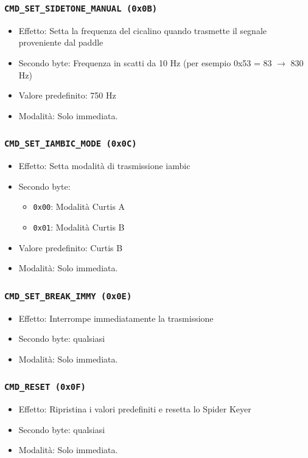 \subsubsection{\texttt{CMD\_SET\_SIDETONE\_MANUAL (0x0B)}}
\begin{itemize}
	\item Effetto: Setta la frequenza del cicalino quando trasmette il segnale proveniente dal paddle
	\item Secondo byte: Frequenza in scatti da 10 Hz (per esempio 0x53 = 83 $\rightarrow$ 830 Hz)
	\item Valore predefinito: 750 Hz
	\item Modalit\`a: Solo immediata.
\end{itemize}

\subsubsection{\texttt{CMD\_SET\_IAMBIC\_MODE (0x0C)}}
\begin{itemize}
	\item Effetto: Setta modalit\`a di trasmissione iambic
	\item Secondo byte:
	\begin{itemize}
		\item \texttt{0x00}: Modalit\`a Curtis A
		\item \texttt{0x01}: Modalit\`a Curtis B
	\end{itemize}
	\item Valore predefinito: Curtis B
	\item Modalit\`a: Solo immediata.
\end{itemize}

\subsubsection{\texttt{CMD\_SET\_BREAK\_IMMY (0x0E)}}
\begin{itemize}
	\item Effetto: Interrompe immediatamente la trasmissione
	\item Secondo byte: qualsiasi
	\item Modalit\`a: Solo immediata.
\end{itemize}

\subsubsection{\texttt{CMD\_RESET (0x0F)}}
\begin{itemize}
	\item Effetto: Ripristina i valori predefiniti e resetta lo Spider Keyer
	\item Secondo byte: qualsiasi
	\item Modalit\`a: Solo immediata.
\end{itemize}

